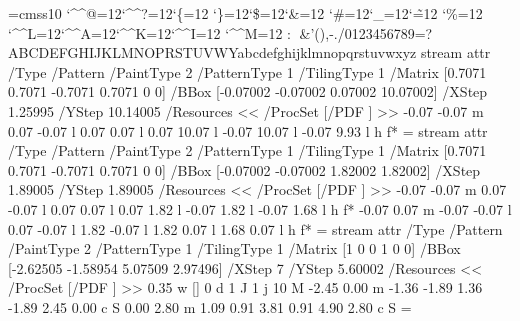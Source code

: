 \font\THFa=cmss10
\begingroup
\catcode`\^^@=12\catcode`\^^?=12\catcode`\{=12
\catcode`\}=12\catcode`\$=12\catcode`\&=12
\catcode`\#=12\catcode`\_=12\catcode`\~=12
\catcode`\%=12
\catcode`\^^L=12\catcode`\^^A=12\catcode`\^^K=12\catcode`\^^I=12
\catcode`\^^M=12
\THFa:^^L^^M&'(),-./0123456789=?ABCDEFGHIJKLMNOPRSTUVWYabcdefghijklmnopqrstuvwxyz\endinclude\endgroup
\immediate\pdfobj stream attr {/Type /Pattern
/PaintType 2 /PatternType 1 /TilingType 1
/Matrix [0.7071 0.7071 -0.7071 0.7071 0 0]
/BBox [-0.07002 -0.07002 0.07002 10.07002]
/XStep 1.25995
/YStep 10.14005
/Resources << /ProcSet [/PDF ] >> } {
-0.07 -0.07 m
0.07 -0.07 l
0.07 0.07 l
0.07 10.07 l
-0.07 10.07 l
-0.07 9.93 l
h
f*
} \newcount \THPa\THPa=\pdflastobj
\immediate\pdfobj stream attr {/Type /Pattern
/PaintType 2 /PatternType 1 /TilingType 1
/Matrix [0.7071 0.7071 -0.7071 0.7071 0 0]
/BBox [-0.07002 -0.07002 1.82002 1.82002]
/XStep 1.89005
/YStep 1.89005
/Resources << /ProcSet [/PDF ] >> } {
-0.07 -0.07 m
0.07 -0.07 l
0.07 0.07 l
0.07 1.82 l
-0.07 1.82 l
-0.07 1.68 l
h
f*
-0.07 0.07 m
-0.07 -0.07 l
0.07 -0.07 l
1.82 -0.07 l
1.82 0.07 l
1.68 0.07 l
h
f*
} \newcount \THPb\THPb=\pdflastobj
\immediate\pdfobj stream attr {/Type /Pattern
/PaintType 2 /PatternType 1 /TilingType 1
/Matrix [1 0 0 1 0 0]
/BBox [-2.62505 -1.58954 5.07509 2.97496]
/XStep 7
/YStep 5.60002
/Resources << /ProcSet [/PDF ] >> } {
0.35 w
[] 0 d
1 J
1 j
10 M
-2.45 0.00 m
-1.36 -1.89 1.36 -1.89 2.45 0.00 c
S
0.00 2.80 m
1.09 0.91 3.81 0.91 4.90 2.80 c
S
} \newcount \THPc\THPc=\pdflastobj

